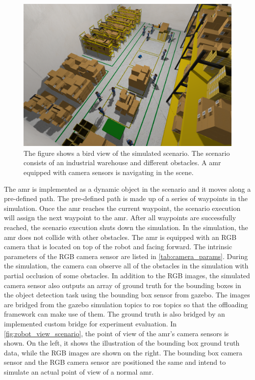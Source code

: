 \begin{figure}
    \centering
    \includegraphics[width=\linewidth]{figures/sim/bird_view.png}
    \caption[Bird view of the simulated scenario]{The figure shows a bird view of the simulated scenario. The scenario consists of an industrial warehouse and different obstacles. A \gls{amr} equipped with camera sensors is navigating in the scene.}
    \label{fig:bird_view_scenario}
\end{figure}

The \gls{amr} is implemented as a dynamic object in the scenario and it moves along a pre-defined path. The pre-defined path is made up of a series of waypoints in the simulation. Once the \gls{amr} reaches the current waypoint, the scenario execution will assign the next waypoint to the \gls{amr}. After all waypoints are successfully reached, the scenario execution shuts down the simulation. In the simulation, the \gls{amr} does not collide with other obstacles. The \gls{amr} is equipped with an RGB camera that is located on top of the robot and facing forward. The intrinsic parameters of the RGB camera sensor are listed in \cref{tab:camera_params}. During the simulation, the camera can observe all of the obstacles in the simulation with partial occlusion of some obstacles. In addition to the RGB images, the simulated camera sensor also outputs an array of ground truth for the bounding boxes in the object detection task using the bounding box sensor from \gls{gazebo}. The images are bridged from the \gls{gazebo} simulation topics to \gls{ros} topics so that the offloading framework can make use of them. The ground truth is also bridged by an implemented custom bridge for experiment evaluation. In \cref{fig:robot_view_scenario}, the point of view of the \gls{amr}'s camera sensors is shown. On the left, it shows the illustration of the bounding box ground truth data, while the RGB images are shown on the right. The bounding box camera sensor and the RGB camera sensor are positioned the same and intend to simulate an actual point of view of a normal \gls{amr}.

